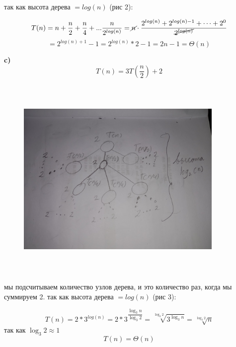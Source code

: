 \documentclass{article}
\begin{document}
\newpage

так как высота дерева $= log(n)$ (рис 2):

\begin{equation*}
    T(n) = n+\dfrac{n}{2}+\dfrac{n}{4}+...\dfrac{n}{2^{log(n)}}= \cancel{n}\cdot \dfrac{2^{log(n)} + 2^{log(n) - 1} + \dots + 2^0}{\cancel{2^{log(n)}}}
\end{equation*}
\begin{equation*}
    = 2^{log(n) + 1} - 1 = 2^{log(n)} * 2 - 1 = 2n - 1 = \Theta(n) 
\end{equation*}

\bigskip
\bigskip
\textbf{c)}
\begin{equation*}
    T(n) = 3T\left(\frac{n}{2}\right) + 2
\end{equation*}

\begin{figure}[h]
    \centering
    \includegraphics[width=10cm, height=10cm]{3.jpg}
    \caption{}
    \label{fig:my_label}
\end{figure}

\newpage

мы подсчитываем количество узлов дерева, и это количество раз, когда мы суммируем 2.\newline
так как высота дерева $= log(n)$ (рис 3):

\begin{equation*}
    T(n) = 2*3^{log(n)} = 2*3^{\dfrac{\log_{3}{n}}{\log_{3}{2}}} = \sqrt[\log_{3}{2}]{3^{\log_{3}{n}}} = \sqrt[\log_{3}{2}]{n}
\end{equation*}
так как $\log_{3}{2} \approx 1$
\begin{equation*}
    T(n)=\Theta(n)
\end{equation*}
\end{document}
